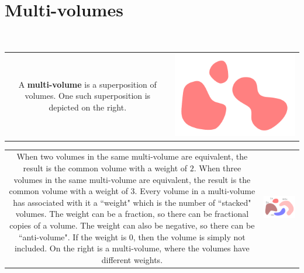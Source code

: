 \section{Multi-volumes}

~

\begin{tabular}{cc}
\parbox{0.5\textwidth}{
A \textbf{multi-volume} is a superposition of volumes. One such superposition is depicted on the right.
} & \parbox{0.5\textwidth}{
\includegraphics[scale = 0.75]{Multi-structures/Multivolumes/multi-volume_simple}
}
\end{tabular}

\begin{tabular}{cc}
\parbox{0.5\textwidth}{
When two volumes in the same multi-volume are equivalent, the result is the common volume with a weight of \(2\). When three volumes in the same multi-volume are equivalent, the result is the common volume with a weight of \(3\). Every volume in a multi-volume has associated with it a ``weight" which is the number of ``stacked" volumes. The weight can be a fraction, so there can be fractional copies of a volume. The weight can also be negative, so there can be ``anti-volume". If the weight is \(0\), then the volume is simply not included. On the right is a multi-volume, where the volumes have different weights.
} & \parbox{0.5\textwidth}{
\includegraphics[scale = 0.75]{Multi-structures/Multivolumes/multi-volume_multiplicity}
}
\end{tabular}

